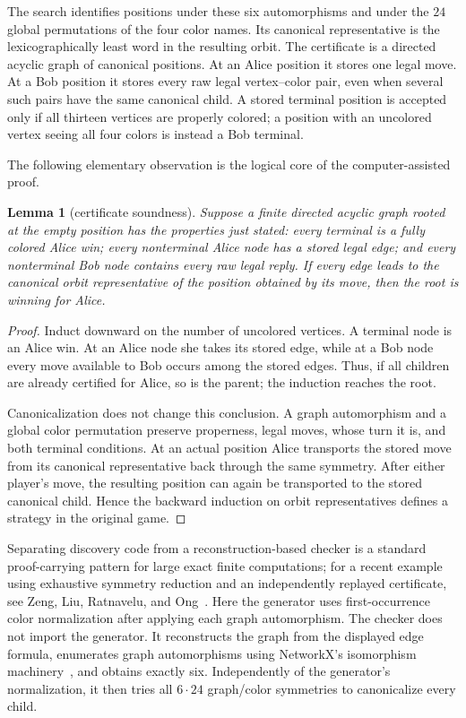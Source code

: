 \documentclass[11pt]{article}
\newtheorem{lemma}[theorem]{Lemma}
\begin{document}
The search identifies positions under these six automorphisms and under the
$24$ global permutations of the four color names.  Its canonical
representative is the lexicographically least word in the resulting orbit.
The certificate is a directed acyclic graph of canonical positions.  At an
Alice position it stores one legal move.  At a Bob position it stores every
raw legal vertex--color pair, even when several such pairs have the same
canonical child.  A stored terminal position is accepted only if all thirteen
vertices are properly colored; a position with an uncolored vertex seeing all
four colors is instead a Bob terminal.

The following elementary observation is the logical core of the
computer-assisted proof.

\begin{lemma}[certificate soundness]\label{lem:soundness}
Suppose a finite directed acyclic graph rooted at the empty position has the
properties just stated: every terminal is a fully colored Alice win; every
nonterminal Alice node has a stored legal edge; and every nonterminal Bob node
contains every raw legal reply.  If every edge leads to the canonical orbit
representative of the position obtained by its move, then the root is winning
for Alice.
\end{lemma}

\begin{proof}
Induct downward on the number of uncolored vertices.  A terminal node is an
Alice win.  At an Alice node she takes its stored edge, while at a Bob node
every move available to Bob occurs among the stored edges.  Thus, if all
children are already certified for Alice, so is the parent; the induction
reaches the root.

Canonicalization does not change this conclusion.  A graph automorphism and
a global color permutation preserve properness, legal moves, whose turn it
is, and both terminal conditions.  At an actual position Alice transports the
stored move from its canonical representative back through the same symmetry.
After either player's move, the resulting position can again be transported
to the stored canonical child.  Hence the backward induction on orbit
representatives defines a strategy in the original game.
\end{proof}

Separating discovery code from a reconstruction-based checker is a standard
proof-carrying pattern for large exact finite computations; for a recent
example using exhaustive symmetry reduction and an independently replayed
certificate, see Zeng, Liu, Ratnavelu, and Ong~\cite{ZengEtAl2026Certificates}.
Here the generator uses first-occurrence color normalization after applying
each graph automorphism.  The checker does not import the generator.  It
reconstructs the graph from the displayed edge formula, enumerates graph
automorphisms using NetworkX's isomorphism machinery~\cite{HagbergSchultSwart2008},
and obtains exactly six.  Independently of the generator's normalization, it
then tries all $6\cdot24$ graph/color symmetries to canonicalize every child.
\end{document}
